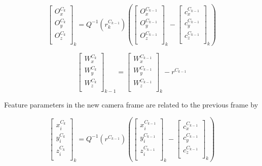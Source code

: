 \begin{equation}
\begin{bmatrix}
O_{x}^{C_{k}} \\
O_{y}^{C_k} \\
O_{z}^{C_k} \\
\end{bmatrix}_{k}=Q^{-1}(r_{k}^{C_{k-1}})\left(
\begin{bmatrix}
O_{x}^{C_{k-1}} \\
O_{y}^{C_{k-1}} \\
O_{z}^{C_{k-1}} \\
\end{bmatrix}_{k}- \begin{bmatrix}
c_{x}^{C_{k-1}} \\
c_{y}^{C_{k-1}} \\
c_{z}^{C_{k-1}} \\
\end{bmatrix}_{k}\right)
\end{equation}

\begin{equation}
\begin{bmatrix}
W_{x}^{C_{k}} \\
W_{y}^{C_{k}} \\
W_{z}^{C_{k}} \\
\end{bmatrix}_{k-1}= \begin{bmatrix}
W_{x}^{C_{k-1}} \\
W_{y}^{C_{k-1}} \\
W_{z}^{C_{k-1}} \\
\end{bmatrix}_{k}-r^{C_{k-1}}
\end{equation}

Feature parameters in the new camera frame are related to the previous frame 
by

\begin{equation}
\begin{bmatrix}
x_{i}^{C_{k}} \\
y_{i}^{C_{k}} \\
z_{i}^{C_{k}} \\
\end{bmatrix}_{k}=Q^{-1}(r^{C_{k-1}})\left(
\begin{bmatrix}
x_{i}^{C_{k-1}} \\
y_{i}^{C_{k-1}} \\
z_{i}^{C_{k-1}} \\
\end{bmatrix}_{k}- \begin{bmatrix}
c_{x}^{C_{k-1}} \\
c_{y}^{C_{k-1}} \\
c_{z}^{C_{k-1}} \\
\end{bmatrix}_{k}\right)
\end{equation}

